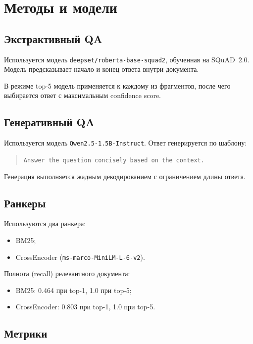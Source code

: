 \documentclass[11pt]{article}
\begin{document}
\section{Методы и модели}

\subsection{Экстрактивный QA}

Используется модель \texttt{deepset/roberta-base-squad2}, обученная на SQuAD~2.0.
Модель предсказывает начало и конец ответа внутри документа.

В режиме top-5 модель применяется к каждому из фрагментов, после чего
выбирается ответ с максимальным confidence score.

\subsection{Генеративный QA}

Используется модель \texttt{Qwen2.5-1.5B-Instruct}. Ответ генерируется
по шаблону:

\begin{quote}
\texttt{Answer the question concisely based on the context.}
\end{quote}

Генерация выполняется жадным декодированием с ограничением длины ответа.

\subsection{Ранкеры}

Используются два ранкера:
\begin{itemize}
    \item BM25;
    \item CrossEncoder (\texttt{ms-marco-MiniLM-L-6-v2}).
\end{itemize}

Полнота (recall) релевантного документа:
\begin{itemize}
    \item BM25: 0.464 при top-1, 1.0 при top-5;
    \item CrossEncoder: 0.803 при top-1, 1.0 при top-5.
\end{itemize}

\subsection{Метрики}
\end{document}

